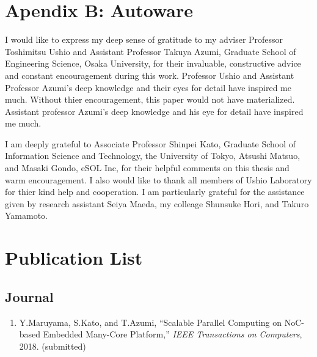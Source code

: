 \documentclass[a4j,12pt,oneside,openany,english]{jsbook}
\begin{document}


\chapter*{Apendix B: Autoware}
\setcounter{chapter}{1}





\begin{acknowledgement}
  I would like to express my deep sense of gratitude to my adviser Professor Toshimitsu Ushio and Assistant Professor Takuya Azumi, Graduate School of Engineering Science, Osaka University, for their invaluable, constructive advice and constant encouragement during this work.
  Professor Ushio and Assistant Professor Azumi's deep knowledge and their eyes for detail have inspired me much.
  Without thier encouragement, this paper would not have materialized.
  Assistant professor Azumi's deep knowledge and his eye for detail have inspired me much.

  I am deeply grateful to Associate Professor Shinpei Kato, Graduate School of Information Science and Technology, the University of Tokyo, Atsushi Matsuo, and Masaki Gondo, eSOL Inc, for their helpful comments on this thesis and warm encouragement.
  I also would like to thank all members of Ushio Laboratory for thier kind help and cooperation.
  I am particularly grateful for the assistance given by research assistant Seiya Maeda, my colleage Shunsuke Hori, and Takuro Yamamoto.
\end{acknowledgement}







\chapter*{Publication List}

\renewcommand{\labelenumi}{[\arabic{enumi}]}

\section*{Journal}
\begin{enumerate}
\item Y.Maruyama, S.Kato, and T.Azumi,
  ``{Scalable Parallel Computing on NoC-based Embedded Many-Core Platform},''
  \emph{IEEE Transactions on Computers}, 2018.
  (submitted)
\end{enumerate}
\end{document}
